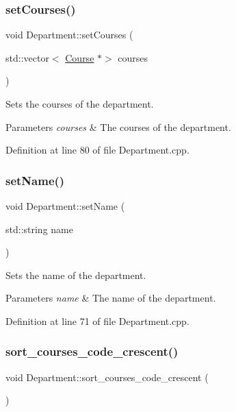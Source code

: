 \subsubsection{\texorpdfstring{set\+Courses()}{setCourses()}}
{\footnotesize\ttfamily void Department\+::set\+Courses (\begin{DoxyParamCaption}\item[{std\+::vector$<$ \hyperlink{classCourse}{Course} $\ast$$>$}]{courses }\end{DoxyParamCaption})}

Sets the courses of the department. 
\begin{DoxyParams}{Parameters}
{\em courses} & The courses of the department. \\
\hline
\end{DoxyParams}


Definition at line 80 of file Department.\+cpp.

\mbox{\label{classDepartment_adbde303b8c83a10b3da68ee9f949f731}} 
\subsubsection{\texorpdfstring{set\+Name()}{setName()}}
{\footnotesize\ttfamily void Department\+::set\+Name (\begin{DoxyParamCaption}\item[{std\+::string}]{name }\end{DoxyParamCaption})}

Sets the name of the department. 
\begin{DoxyParams}{Parameters}
{\em name} & The name of the department. \\
\hline
\end{DoxyParams}


Definition at line 71 of file Department.\+cpp.

\mbox{\label{classDepartment_accf36d58f8b5e8110148f3a69ad30278}} 
\subsubsection{\texorpdfstring{sort\+\_\+courses\+\_\+code\+\_\+crescent()}{sort\_courses\_code\_crescent()}}
{\footnotesize\ttfamily void Department\+::sort\+\_\+courses\+\_\+code\+\_\+crescent (\begin{DoxyParamCaption}{ }\end{DoxyParamCaption})}

